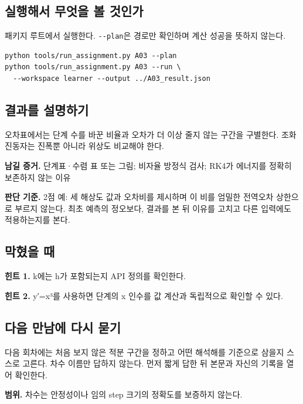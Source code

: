 \documentclass[
  10pt,
  a4paper,
]{article}
\begin{document}
\newpage

\subsection{실행해서 무엇을 볼
것인가}\label{uxc2e4uxd589uxd574uxc11c-uxbb34uxc5c7uxc744-uxbcfc-uxac83uxc778uxac00}

패키지 루트에서 실행한다. \texttt{-\/-plan}은 경로만 확인하며 계산
성공을 뜻하지 않는다.

\begin{verbatim}
python tools/run_assignment.py A03 --plan
python tools/run_assignment.py A03 --run \
  --workspace learner --output ../A03_result.json
\end{verbatim}

\subsection{결과를
설명하기}\label{uxacb0uxacfcuxb97c-uxc124uxba85uxd558uxae30}

오차표에서는 단계 수를 바꾼 비율과 오차가 더 이상 줄지 않는 구간을
구별한다. 조화진동자는 진폭뿐 아니라 위상도 비교해야 한다.

\textbf{남길 증거.} 단계표·수렴 표 또는 그림; 비자율 방정식 검사; RK4가
에너지를 정확히 보존하지 않는 이유

\textbf{판단 기준.} 2점 예: 세 해상도 값과 오차비를 제시하며 이 비를
엄밀한 전역오차 상한으로 부르지 않는다. 최초 예측의 정오보다, 결과를 본
뒤 이유를 고치고 다른 입력에도 적용하는지를 본다.

\subsection{막혔을 때}\label{uxb9c9uxd614uxc744-uxb54c}

\textbf{힌트 1.} k에는 h가 포함되는지 API 정의를 확인한다.

\textbf{힌트 2.} y′=x³를 사용하면 단계의 x 인수를 값 계산과 독립적으로
확인할 수 있다.

\subsection{다음 만남에 다시
묻기}\label{uxb2e4uxc74c-uxb9ccuxb0a8uxc5d0-uxb2e4uxc2dc-uxbb3buxae30}

다음 회차에는 처음 보지 않은 적분 구간을 정하고 어떤 해석해를 기준으로
삼을지 스스로 고른다. 차수 이름만 답하지 않는다. 먼저 짧게 답한 뒤
본문과 자신의 기록을 열어 확인한다.

\textbf{범위.} 차수는 안정성이나 임의 step 크기의 정확도를 보증하지
않는다.
\end{document}
